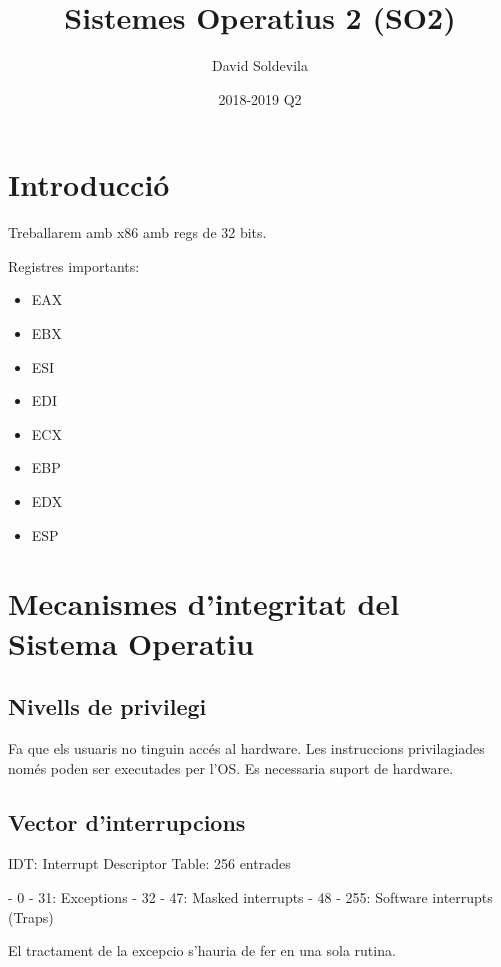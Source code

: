 \documentclass{article}
\title{Sistemes Operatius 2 (SO2)}
\date{2018-2019 Q2}
\author{David Soldevila}
\begin{document}
    \maketitle  

    \pagebreak
    
    \tableofcontents
    
    \pagebreak

    \section{Introducció}

    Treballarem amb x86 amb regs de 32 bits.

    Registres importants:
    \begin{itemize}
        \item EAX
        \item EBX
        \item ESI
        \item EDI
        \item ECX
        \item EBP
        \item EDX     
        \item ESP
    \end{itemize}

    \pagebreak

    \section{Mecanismes d'integritat del Sistema Operatiu}

    \subsection{Nivells de privilegi}

    Fa que els usuaris no tinguin accés al hardware. Les instruccions privilagiades només poden ser executades per l'OS. Es necessaria suport de hardware.

    \subsection{Vector d'interrupcions}

    IDT: Interrupt Descriptor Table: 256 entrades

    - 0 - 31: Exceptions
    - 32 - 47: Masked interrupts
    - 48 - 255: Software interrupts (Traps)

    El tractament de la excepcio s'hauria de fer en una sola rutina.
\end{document}
